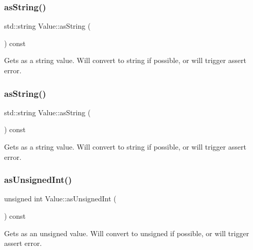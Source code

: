 \subsubsection{\texorpdfstring{as\+String()}{asString()}\hspace{0.1cm}{\footnotesize\ttfamily [1/2]}}
{\footnotesize\ttfamily std\+::string Value\+::as\+String (\begin{DoxyParamCaption}{ }\end{DoxyParamCaption}) const}

Gets as a string value. Will convert to string if possible, or will trigger assert error. \mbox{\label{classValue_af2125ceb5eb007b6cd6ab77666682117}} 
\subsubsection{\texorpdfstring{as\+String()}{asString()}\hspace{0.1cm}{\footnotesize\ttfamily [2/2]}}
{\footnotesize\ttfamily std\+::string Value\+::as\+String (\begin{DoxyParamCaption}{ }\end{DoxyParamCaption}) const}

Gets as a string value. Will convert to string if possible, or will trigger assert error. \mbox{\label{classValue_af7d3b1f00d25385ce608c3e7b6363f7b}} 
\subsubsection{\texorpdfstring{as\+Unsigned\+Int()}{asUnsignedInt()}\hspace{0.1cm}{\footnotesize\ttfamily [1/2]}}
{\footnotesize\ttfamily unsigned int Value\+::as\+Unsigned\+Int (\begin{DoxyParamCaption}{ }\end{DoxyParamCaption}) const}

Gets as an unsigned value. Will convert to unsigned if possible, or will trigger assert error. \mbox{\label{classValue_af7d3b1f00d25385ce608c3e7b6363f7b}} 
